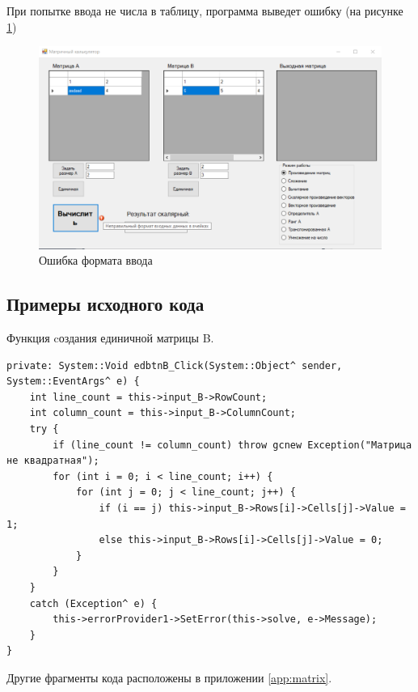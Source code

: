 При попытке ввода не числа в таблицу, программа выведет ошибку (на рисунке \ref{task6_launch3})
\begin{figure}[H]
    \centering
    \includegraphics[width=1\linewidth]{lections/img/task6_launch3.png}
    \caption{Ошибка формата ввода}
    \label{task6_launch3}
\end{figure}


\subsection{Примеры исходного кода}


Функция cоздания единичной матрицы B.
\begin{verbatim}
private: System::Void edbtnB_Click(System::Object^ sender, System::EventArgs^ e) {
	int line_count = this->input_B->RowCount;
	int column_count = this->input_B->ColumnCount;
	try {
		if (line_count != column_count) throw gcnew Exception("Матрица не квадратная");
		for (int i = 0; i < line_count; i++) {
			for (int j = 0; j < line_count; j++) {
				if (i == j) this->input_B->Rows[i]->Cells[j]->Value = 1;
				else this->input_B->Rows[i]->Cells[j]->Value = 0;
			}
		}
	}
	catch (Exception^ e) {
		this->errorProvider1->SetError(this->solve, e->Message);
	}
}
\end{verbatim}
Другие фрагменты кода расположены в приложении \ref{app:matrix}.
\sectionbreak